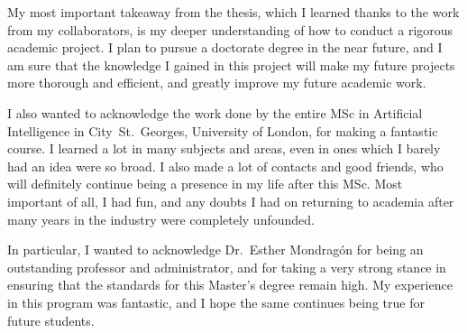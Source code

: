 \documentclass[a4paper,11pt]{article}
\begin{document}
My most important takeaway from the thesis, which I learned thanks to the work from my collaborators, is my deeper understanding of how to conduct a rigorous academic project.
I plan to pursue a doctorate degree in the near future, and I am sure that the knowledge I gained in this project will make my future projects more thorough and efficient, and greatly improve my future academic work.

I also wanted to acknowledge the work done by the entire MSc in Artificial Intelligence in City~St.~Georges, University of London, for making a fantastic course.
I learned a lot in many subjects and areas, even in ones which I barely had an idea were so broad.
I also made a lot of contacts and good friends, who will definitely continue being a presence in my life after this MSc.
Most important of all, I had fun, and any doubts I had on returning to academia after many years in the industry were completely unfounded.

In particular, I wanted to acknowledge Dr.\ Esther Mondragón for being an outstanding professor and administrator, and for taking a very strong stance in ensuring that the standards for this Master's degree remain high.
My experience in this program was fantastic, and I hope the same continues being true for future students.

\clearpage{}


\clearpage{}
\tableofcontents{}

\clearpage{}


\clearpage{}


\clearpage{}


% 

\clearpage{}


% 

\clearpage{}


\clearpage{}


\clearpage{}


\clearpage{}
\begin{small}
	
\end{small}

\clearpage{}

\appendixpage{}
\appendix{}



\clearpage{}

% 



\clearpage{}

\end{document}
